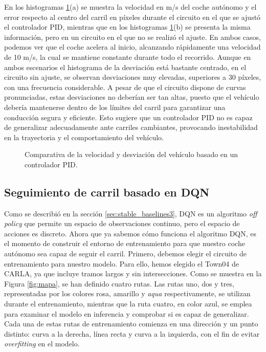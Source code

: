 En los histogramas \ref{fig:comparativa_pid}(a) se muestra la velocidad en m/s del coche autónomo y el error respecto al centro del carril en píxeles durante el circuito en el que se ajustó el controlador \ac{PID}, mientras que en los histogramas \ref{fig:comparativa_pid}(b) se presenta la misma información, pero en un circuito en el que no se realizó el ajuste. En ambos casos, podemos ver que el coche acelera al inicio, alcanzando rápidamente una velocidad de 10 m/s, la cual se mantiene constante durante todo el recorrido. Aunque en ambos escenarios el histograma de la desviación está bastante centrado, en el circuito sin ajuste, se observan desviaciones muy elevadas, superiores a 30 píxeles, con una frecuencia considerable. A pesar de que el circuito dispone de curvas pronunciadas, estas desviaciones no deberían ser tan altas, puesto que el vehículo debería mantenerse dentro de los límites del carril para garantizar una conducción segura y eficiente. Esto sugiere que un controlador \ac{PID} no es capaz de generalizar adecuadamente ante carriles cambiantes, provocando inestabilidad en la trayectoria y el comportamiento del vehículo.

\begin{figure}[ht]
\centering
{}
\hfill
{}
\caption{Comparativa de la velocidad y desviación del vehículo basado en un controlador \ac{PID}.}
\label{fig:comparativa_pid}
\end{figure}

\subsection{Seguimiento de carril basado en \ac{DQN}}

Como se describió en la sección \ref{sec:stable_baselines3}, \ac{DQN} es un algoritmo \textit{off policy} que permite un espacio de observaciones continuo, pero el espacio de acciones es discreto. Ahora que ya sabemos cómo funciona el algoritmo \ac{DQN}, es el momento de construir el entorno de entrenamiento para que nuestro coche autónomo sea capaz de seguir el carril. Primero, debemos elegir el circuito de entrenamiento para nuestro modelo. Para ello, hemos elegido el Town04 de CARLA, ya que incluye tramos largos y sin intersecciones. Como se muestra en la Figura \ref{fig:mapa}, se han definido cuatro rutas. Las rutas uno, dos y tres, representadas por los colores rosa, amarillo y \textit{aqua} respectivamente, se utilizan durante el entrenamiento, mientras que la ruta cuatro, en color azul, se emplea para examinar el modelo en inferencia y comprobar si es capaz de generalizar. Cada una de estas rutas de entrenamiento comienza en una dirección y un punto distinto: curva a la derecha, línea recta y curva a la izquierda, con el fin de evitar \textit{overfitting} en el modelo.

